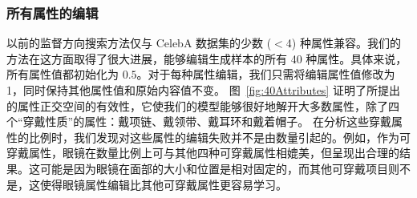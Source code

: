 \subsubsection{所有属性的编辑}
以前的监督方向搜索方法仅与 CelebA 数据集的少数 ($<$4) 种属性兼容。我们的方法在这方面取得了很大进展，能够编辑生成样本的所有 40 种属性。具体来说，所有属性值都初始化为 $0.5$。对于每种属性编辑，我们只需将编辑属性值修改为1，同时保持其他属性值和原始内容值不变。 图~\ref{fig:40Attributes} 证明了所提出的属性正交空间的有效性，它使我们的模型能够很好地解开大多数属性，除了四个“穿戴性质”的属性：戴项链、戴领带、戴耳环和戴着帽子。
在分析这些穿戴属性的比例时，我们发现对这些属性的编辑失败并不是由数量引起的。例如，作为可穿戴属性，眼镜在数量比例上可与其他四种可穿戴属性相媲美，但呈现出合理的结果。这可能是因为眼镜在面部的大小和位置是相对固定的，而其他可穿戴项目则不是，这使得眼镜属性编辑比其他可穿戴属性更容易学习。

